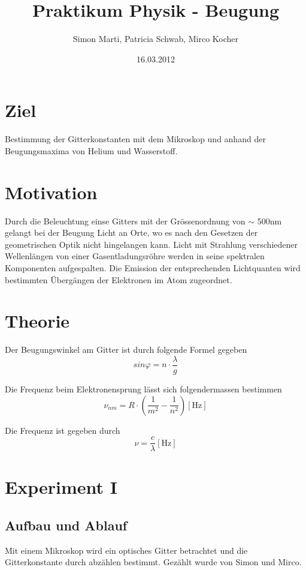 \documentclass[12pt,a4paper]{article}
\title{Praktikum Physik - Beugung}
\author{Simon Marti, Patricia Schwab, Mirco Kocher}
\date{16.03.2012}
\begin{document}
\maketitle

\section*{Ziel}
Bestimmung der Gitterkonstanten mit dem Mikroskop und anhand der Beugungsmaxima von Helium und Wasserstoff.

\section*{Motivation}
Durch die Beleuchtung einse Gitters mit der Gr\"ossenordnung von $\sim$ 500nm gelangt bei der Beugung Licht an Orte, wo es nach den Gesetzen der geo\-metrischen Optik nicht hingelangen kann. Licht mit Strahlung verschiedener Wellenl\"angen von einer Gasentladungsr\"ohre werden in seine spektralen Komponenten aufgespalten. Die Emission der entsprechenden Lichtquanten wird bestimmten \"Uberg\"angen der Elektronen im Atom zugeordnet.


\section*{Theorie}
Der Beugungswinkel am Gitter ist durch folgende Formel gegeben
\begin{equation}\label{eq:g}
sin\varphi = n\cdot \frac{\lambda}{g}
\end{equation}

Die Frequenz beim Elektronensprung l\"asst sich folgendermassen bestimmen
\begin{equation}\label{eq:e}
\nu_{nm} = R\cdot \left(\frac{1}{m^2}-\frac{1}{n^2}\right) [\mbox{Hz}]
\end{equation}

Die Frequenz ist gegeben durch 
\begin{equation}\label{eq:f}
\nu = \frac{c}{\lambda} [\mbox{Hz}]
\end{equation}

\section*{Experiment I}
\subsection*{Aufbau und Ablauf}
Mit einem Mikroskop wird ein optisches Gitter betrachtet und die Gitterkonstante durch abz\"ahlen bestimmt.
Gez\"ahlt wurde von Simon und Mirco.
\end{document}
